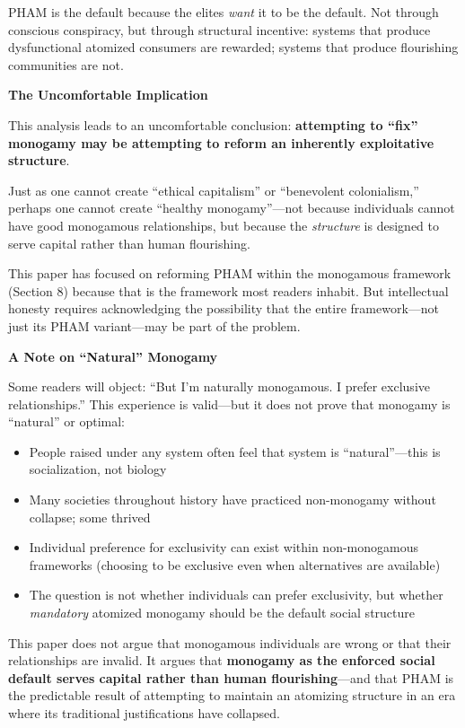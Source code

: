 \documentclass[12pt, letterpaper]{article}
\begin{document}
PHAM is the default because the elites \textit{want} it to be the default. Not through conscious conspiracy, but through structural incentive: systems that produce dysfunctional atomized consumers are rewarded; systems that produce flourishing communities are not.

\textbf{The Uncomfortable Implication}

This analysis leads to an uncomfortable conclusion: \textbf{attempting to ``fix'' monogamy may be attempting to reform an inherently exploitative structure}.

Just as one cannot create ``ethical capitalism'' or ``benevolent colonialism,'' perhaps one cannot create ``healthy monogamy''---not because individuals cannot have good monogamous relationships, but because the \textit{structure} is designed to serve capital rather than human flourishing.

This paper has focused on reforming PHAM within the monogamous framework (Section 8) because that is the framework most readers inhabit. But intellectual honesty requires acknowledging the possibility that the entire framework---not just its PHAM variant---may be part of the problem.

\textbf{A Note on ``Natural'' Monogamy}

Some readers will object: ``But I'm naturally monogamous. I prefer exclusive relationships.'' This experience is valid---but it does not prove that monogamy is ``natural'' or optimal:

\begin{itemize}
    \item People raised under any system often feel that system is ``natural''---this is socialization, not biology
    \item Many societies throughout history have practiced non-monogamy without collapse; some thrived
    \item Individual preference for exclusivity can exist within non-monogamous frameworks (choosing to be exclusive even when alternatives are available)
    \item The question is not whether individuals can prefer exclusivity, but whether \textit{mandatory} atomized monogamy should be the default social structure
\end{itemize}

This paper does not argue that monogamous individuals are wrong or that their relationships are invalid. It argues that \textbf{monogamy as the enforced social default serves capital rather than human flourishing}---and that PHAM is the predictable result of attempting to maintain an atomizing structure in an era where its traditional justifications have collapsed.
\end{document}
